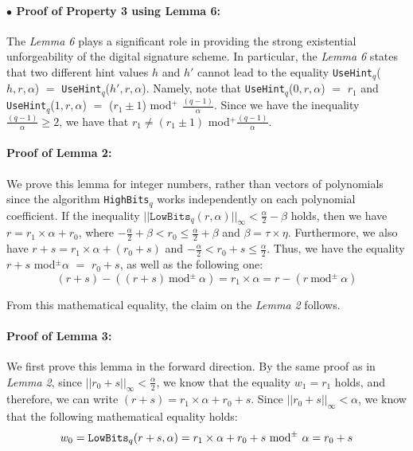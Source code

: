 \documentclass[runningheads]{llncs}
\numberwithin{equation}{section}
\begin{document}
    \paragraph{$\bullet$ \textbf{Proof of Property 3 using Lemma 6:}} The \textit{Lemma 6} plays a significant role in providing the strong existential unforgeability of the digital signature scheme. In particular, the \textit{Lemma 6} states that two different hint values $h$ and $h'$ cannot lead to the equality \texttt{UseHint}${}_{q}$($h, r, \alpha$) $=$ \texttt{UseHint}${}_{q}$($h', r, \alpha$). Namely, note that  \texttt{UseHint}${}_{q}$($0, r, \alpha$) $=$ ${r}_{1}$ and \texttt{UseHint}${}_{q}$($1, r, \alpha$) $=$ (${r}_{1} \pm 1$) mod${}^{+}$ $\frac{(q - 1)}{\alpha}$. Since we have the inequality $\frac{(q - 1)}{\alpha} \geq 2$, we have that ${r}_{1} \neq ({r}_{1} \pm 1)$ mod${}^{+}$$\frac{(q - 1)}{\alpha}$.

    \vspace{2.5ex}

    \paragraph{\textbf{Proof of Lemma 2:}} We prove this lemma for integer numbers, rather than vectors of polynomials since the algorithm \texttt{HighBits}${}_{q}$ works independently on each polynomial coefficient. If the inequality ${|| \mathrm{\texttt{LowBits}}{}_{q}(r, \alpha) ||_{\infty}} < \frac{\alpha}{2} - \beta$ holds, then we have $r = {r}_{1} \times \alpha + {r}_{0}$, where $-\frac{\alpha}{2} + \beta < {r}_{0} \leq \frac{\alpha}{2} + \beta$ and $\beta = \tau \times \eta$. Furthermore, we also have $r + s = {r}_{1} \times \alpha + ({r}_{0} + s)$ and $-\frac{\alpha}{2} < {r}_{0} + s \leq \frac{\alpha}{2}$. Thus, we have the equality $r + s$ mod${}^{\pm} \alpha$ $=$ ${r}_{0} + s$, as well as the following one:
    $$ (r + s) - \left( (r + s)\ \mathrm{\text{mod}}{}^{\pm}\ \alpha \right) = {r}_{1} \times \alpha = r - (r\ \mathrm{\text{mod}}{}^{\pm}\ \alpha) $$

    \noindent From this mathematical equality, the claim on the \textit{Lemma 2} follows.
    
    \vspace{2.5ex}

    \paragraph{\textbf{Proof of Lemma 3:}} We first prove this lemma in the forward direction. By the same proof as in \textit{Lemma 2}, since ${|| {r}_{0} + s ||}_{\infty} < \frac{\alpha}{2}$, we know that the equality ${w}_{1} = {r}_{1}$ holds, and therefore, we can write $(r + s) = {r}_{1} \times \alpha + {r}_{0} + s$. Since ${|| {r}_{0} + s ||}_{\infty} < \alpha$, we know that the following mathematical equality holds:
    $$ {w}_{0} = \mathrm{\text{\texttt{LowBits}}}{}_{q}(r + s, \alpha) = {r}_{1} \times \alpha + {r}_{0} + s\ \mathrm{\text{mod}}{}^{\pm}\ \alpha = {r}_{0} + s $$
\end{document}
